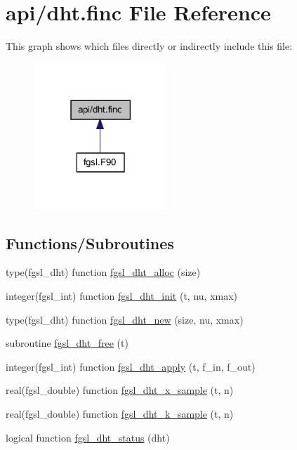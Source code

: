 \hypertarget{dht_8finc}{}\section{api/dht.finc File Reference}
\label{dht_8finc}
This graph shows which files directly or indirectly include this file\+:\nopagebreak
\begin{figure}[H]
\begin{center}
\leavevmode
\includegraphics[width=142pt]{dht_8finc__dep__incl}
\end{center}
\end{figure}
\subsection*{Functions/\+Subroutines}
\begin{DoxyCompactItemize}
\item 
type(fgsl\+\_\+dht) function \hyperlink{dht_8finc_afb86f7c8f57dc3d670480fedf967ecd4}{fgsl\+\_\+dht\+\_\+alloc} (size)
\item 
integer(fgsl\+\_\+int) function \hyperlink{dht_8finc_abb2bcd0254c3b7209be2be3e92ff3fa6}{fgsl\+\_\+dht\+\_\+init} (t, nu, xmax)
\item 
type(fgsl\+\_\+dht) function \hyperlink{dht_8finc_adea7d327ef1817dee38b9425de98585b}{fgsl\+\_\+dht\+\_\+new} (size, nu, xmax)
\item 
subroutine \hyperlink{dht_8finc_ae26b17e9d3a3a0e428ace07554351086}{fgsl\+\_\+dht\+\_\+free} (t)
\item 
integer(fgsl\+\_\+int) function \hyperlink{dht_8finc_a587dbba2d2d50e3e07d1f4ba1a7a1989}{fgsl\+\_\+dht\+\_\+apply} (t, f\+\_\+in, f\+\_\+out)
\item 
real(fgsl\+\_\+double) function \hyperlink{dht_8finc_af6b6534c16d8cfcfaeae9ea4ea9fa3c4}{fgsl\+\_\+dht\+\_\+x\+\_\+sample} (t, n)
\item 
real(fgsl\+\_\+double) function \hyperlink{dht_8finc_ab0250953195cfe60a32a5c5d532fdf75}{fgsl\+\_\+dht\+\_\+k\+\_\+sample} (t, n)
\item 
logical function \hyperlink{dht_8finc_a58dc6a67e94415bb013e635effcefa24}{fgsl\+\_\+dht\+\_\+status} (dht)
\end{DoxyCompactItemize}


